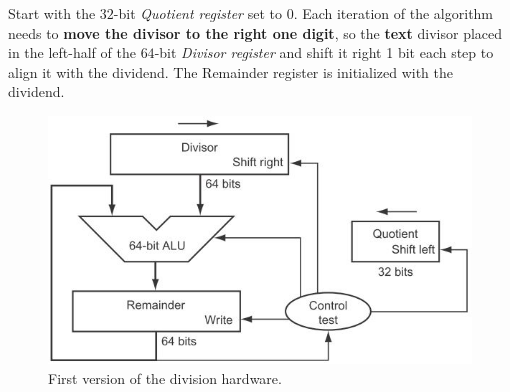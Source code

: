\documentclass[10pt,a4paper]{article}
\begin{document}
Start with the $32$-bit \textit{Quotient register} set to $0$. Each iteration of the algorithm needs
to \textbf{move the divisor to the right one digit}, so the \textbf{text} divisor placed in the left-half 
of the $64$-bit \textit{Divisor register} and shift it right 1 bit each step to align it with the 
dividend. The Remainder register is initialized with the dividend.
\begin{figure} [h!]
    \centering
    \includegraphics[scale=0.7]{Division.JPG}
    \caption{First version of the division hardware.}
\end{figure}
\end{document}
